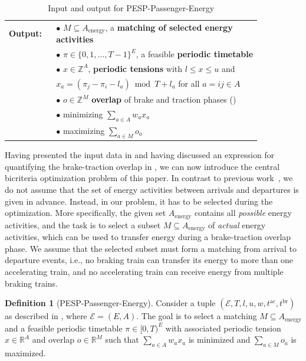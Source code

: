\documentclass[11pt,a4paper]{article}
\newcommand{\energy}{\mathrm{energy}}
\newcommand{\energyact}{M}               %
\newcommand{\possenergyact}{A_{\energy}} %
\newcommand{\ac}{\mathrm{ac}}
\newcommand{\br}{\mathrm{br}}
\newcommand{\pesppassenergy}{PESP-Passenger-Energy\xspace}
\newcommand{\R}{\mathbb R}
\newcommand{\Z}{\mathbb Z}
\newcommand{\cE}{\mathcal{E}}
\theoremstyle{definition}
\newtheorem{definition}[theorem]{Definition}
\theoremstyle{remark}
\begin{document}
\begin{table}[ht]
\begin{tabular}{ | p{0.15 \linewidth} | p{0.7 \linewidth}|}
		\textbf{Output:} 
        &$\bullet$ $\energyact \subseteq \possenergyact$, a \textbf{matching of selected energy activities} \\
        &$\bullet$ $\pi \in \{0,1, \dots , T-1 \}^{E}$, a feasible \textbf{periodic timetable} \\
		&$\bullet$  $x \in \Z^{A}$, \textbf{periodic tensions} with $l\leq x \leq u$ and \\
		& \hspace{5pt} $x_a = (\pi_{j}-\pi_{i}-l_{a})
        \bmod T + l_{a}$ for all $a = ij \in A$ \\
		& $\bullet$ $o\in \Z^{\energyact}$ \textbf{overlap} of brake and traction phases (\Cref{def:overlap})\\
		& $\bullet$  minimizing $\sum_{a \in A} w_a x_a$ \\
		& $\bullet$ maximizing $ \sum_{a \in \energyact} o_a$\\ %
		 \hline
	\end{tabular}
    \caption{Input and output for \pesppassenergy}
	\label{tab:prob-in-out}
\end{table}

Having presented the input data in  and having discussed an expression for quantifying the brake-traction overlap in , we can now introduce the central bicriteria optimization problem of this paper. In contrast to previous work~\cite{Wang2022a,Wang2022}, we do not assume that the set of energy activities between arrivals and departures is given in advance. Instead, in our problem, it has to be selected during the optimization. More specifically, the given set $A_{\energy}$ contains all \emph{possible} energy activities, and the task is to select a subset $\energyact \subseteq \possenergyact$ of \emph{actual} energy activities, which can be used to transfer energy during a brake-traction overlap phase. We assume that the selected subset must form a matching from arrival to departure events, i.e., no braking train can transfer its energy to more than one accelerating train, and no accelerating train can receive energy from multiple braking trains.

\begin{definition}[\pesppassenergy]
    Consider a tuple $(\cE, T, l, u, w, t^{\ac}, t^{\br})$ as described in , where $\cE = (E, A)$. The goal is to select a matching $\energyact \subseteq \possenergyact$ and a feasible periodic timetable $\pi \in [0, T)^E$ with associated periodic tension $x \in \R^A$ and overlap $o \in \R^{\energyact}$ such that $\sum_{a \in A} w_a x_a$ is minimized and $\sum_{a \in \energyact} o_a$ is maximized.
\end{definition}
\end{document}
